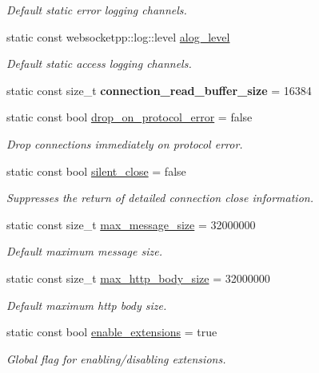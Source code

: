 \begin{DoxyCompactItemize}
\begin{DoxyCompactList}\small\item\em Default static error logging channels. \end{DoxyCompactList}\item 
static const websocketpp\+::log\+::level \mbox{\hyperlink{structwebsocketpp_1_1config_1_1core_abcefa380ef3c250f919ae6a44a9b5724}{alog\+\_\+level}}
\begin{DoxyCompactList}\small\item\em Default static access logging channels. \end{DoxyCompactList}\item 
\mbox{\label{structwebsocketpp_1_1config_1_1core_af1f28eec2b5e12b6d7cccb0c87835119}} 
static const size\+\_\+t {\bfseries connection\+\_\+read\+\_\+buffer\+\_\+size} = 16384
\item 
static const bool \mbox{\hyperlink{structwebsocketpp_1_1config_1_1core_aa103c2e42ba4c43a34e918048b478890}{drop\+\_\+on\+\_\+protocol\+\_\+error}} = false
\begin{DoxyCompactList}\small\item\em Drop connections immediately on protocol error. \end{DoxyCompactList}\item 
static const bool \mbox{\hyperlink{structwebsocketpp_1_1config_1_1core_acb5ef1d40ae50ab2443837270d715f53}{silent\+\_\+close}} = false
\begin{DoxyCompactList}\small\item\em Suppresses the return of detailed connection close information. \end{DoxyCompactList}\item 
static const size\+\_\+t \mbox{\hyperlink{structwebsocketpp_1_1config_1_1core_a54875ed41a1d11149c684f9467b2e0d5}{max\+\_\+message\+\_\+size}} = 32000000
\begin{DoxyCompactList}\small\item\em Default maximum message size. \end{DoxyCompactList}\item 
static const size\+\_\+t \mbox{\hyperlink{structwebsocketpp_1_1config_1_1core_a4836b30dbc83db465f44aabae4e8ef55}{max\+\_\+http\+\_\+body\+\_\+size}} = 32000000
\begin{DoxyCompactList}\small\item\em Default maximum http body size. \end{DoxyCompactList}\item 
\mbox{\label{structwebsocketpp_1_1config_1_1core_af2944a777c23010137c55fdfcfb8c352}} 
static const bool \mbox{\hyperlink{structwebsocketpp_1_1config_1_1core_af2944a777c23010137c55fdfcfb8c352}{enable\+\_\+extensions}} = true
\begin{DoxyCompactList}\small\item\em Global flag for enabling/disabling extensions. \end{DoxyCompactList}\end{DoxyCompactItemize}


